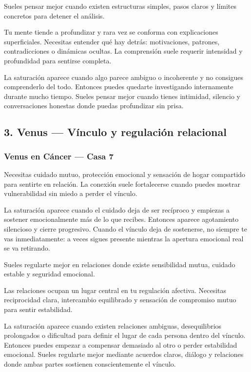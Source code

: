 \documentclass[11pt,a4paper]{article}
\begin{document}
Sueles pensar mejor cuando existen estructuras simples, pasos claros y límites concretos para detener el análisis.

Tu mente tiende a profundizar y rara vez se conforma con explicaciones superficiales. Necesitas entender qué hay detrás: motivaciones, patrones, contradicciones o dinámicas ocultas. La comprensión suele requerir intensidad y profundidad para sentirse completa.

La saturación aparece cuando algo parece ambiguo o incoherente y no consigues comprenderlo del todo. Entonces puedes quedarte investigando internamente durante mucho tiempo. Sueles pensar mejor cuando tienes intimidad, silencio y conversaciones honestas donde puedas profundizar sin prisa.

\vspace{0.8cm}

\subsection{3. Venus — Vínculo y regulación relacional}

\subsubsection*{Venus en Cáncer — Casa 7}

\justifying
Necesitas cuidado mutuo, protección emocional y sensación de hogar compartido para sentirte en relación. La conexión suele fortalecerse cuando puedes mostrar vulnerabilidad sin miedo a perder el vínculo.

La saturación aparece cuando el cuidado deja de ser recíproco y empiezas a sostener emocionalmente más de lo que recibes. Entonces aparece agotamiento silencioso y cierre progresivo. Cuando el vínculo deja de sostenerse, no siempre te vas inmediatamente: a veces sigues presente mientras la apertura emocional real se va retirando.

Sueles regularte mejor en relaciones donde existe sensibilidad mutua, cuidado estable y seguridad emocional.

Las relaciones ocupan un lugar central en tu regulación afectiva. Necesitas reciprocidad clara, intercambio equilibrado y sensación de compromiso mutuo para sentir estabilidad.

La saturación aparece cuando existen relaciones ambiguas, desequilibrios prolongados o dificultad para definir el lugar de cada persona dentro del vínculo. Entonces puedes empezar a compensar demasiado al otro o perder estabilidad emocional. Sueles regularte mejor mediante acuerdos claros, diálogo y relaciones donde ambas partes sostienen conscientemente el vínculo.
\end{document}
